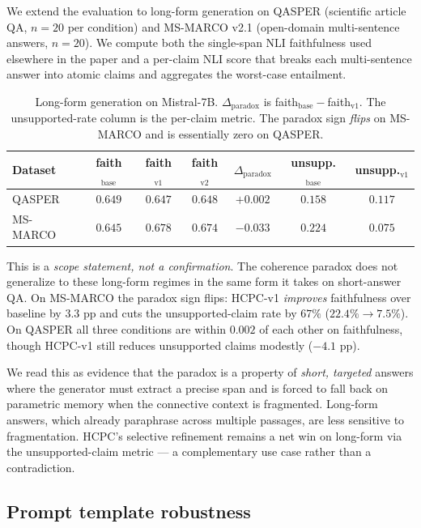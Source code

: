 We extend the evaluation to long-form generation on QASPER (scientific
article QA, $n=20$ per condition) and MS-MARCO v2.1 (open-domain
multi-sentence answers, $n=20$). We compute both the single-span NLI
faithfulness used elsewhere in the paper and a per-claim NLI score that
breaks each multi-sentence answer into atomic claims and aggregates the
worst-case entailment.

\begin{table}[!htb]
\centering
\caption{Long-form generation on Mistral-7B. \emph{$\Delta_{\textrm{paradox}}$}
is faith$_{\textrm{base}}-$faith$_{\textrm{v1}}$. The unsupported-rate
column is the per-claim metric. The paradox sign \emph{flips} on MS-MARCO
and is essentially zero on QASPER.}
\label{tab:longform}
\footnotesize
\begin{tabular}{lcccccc}
\toprule
Dataset & faith$_{\textrm{base}}$ & faith$_{\textrm{v1}}$ & faith$_{\textrm{v2}}$ & $\Delta_{\textrm{paradox}}$ & unsupp.$_{\textrm{base}}$ & unsupp.$_{\textrm{v1}}$ \\
\midrule
QASPER   & $0.649$ & $0.647$ & $0.648$ & $+0.002$ & $0.158$ & $0.117$ \\
MS-MARCO & $0.645$ & $0.678$ & $0.674$ & $-0.033$ & $0.224$ & $\mathbf{0.075}$ \\
\bottomrule
\end{tabular}
\end{table}

This is a \emph{scope statement, not a confirmation}. The coherence
paradox does not generalize to these long-form regimes in the same form
it takes on short-answer QA. On MS-MARCO the paradox sign flips:
HCPC-v1 \emph{improves} faithfulness over baseline by $3.3$ pp and cuts
the unsupported-claim rate by $67\%$ ($22.4\% \to 7.5\%$). On QASPER
all three conditions are within $0.002$ of each other on faithfulness,
though HCPC-v1 still reduces unsupported claims modestly ($-4.1$ pp).

We read this as evidence that the paradox is a property of \emph{short,
targeted} answers where the generator must extract a precise span and is
forced to fall back on parametric memory when the connective context is
fragmented. Long-form answers, which already paraphrase across multiple
passages, are less sensitive to fragmentation. HCPC's selective
refinement remains a net win on long-form via the unsupported-claim
metric — a complementary use case rather than a contradiction.

\subsection{Prompt template robustness}
\label{sec:rob:prompt}

